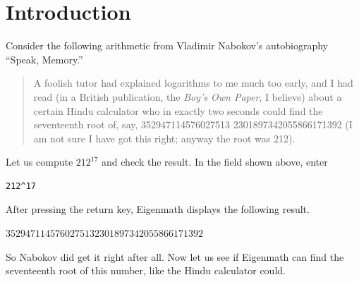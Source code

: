 \section{Introduction}

\noindent

\begin{center}
\end{center}

\noindent
Consider the following arithmetic from Vladimir Nabokov's autobiography ``Speak, Memory.''

\begin{quote}
A foolish tutor had explained logarithms to me much too early, and I had
read (in a British publication, the {\it Boy's Own Paper}, I believe)
about a certain Hindu calculator who in exactly two seconds could find the
seventeenth root of, say,
352947114576027513 2301897342055866171392
(I am not sure I have got this right; anyway the root was 212).
\end{quote}

\noindent
Let us compute $212^{17}$ and check the result.
In the field shown above, enter

{\color{blue}
\begin{verbatim}
212^17
\end{verbatim}
}

\noindent
After pressing the return key, Eigenmath displays the following result.

\bigskip
\noindent
$3529471145760275132301897342055866171392$

\bigskip
\noindent
So Nabokov did get it right after all.
Now let us see if Eigenmath can find the
seventeenth root of this number, like the Hindu calculator could.


